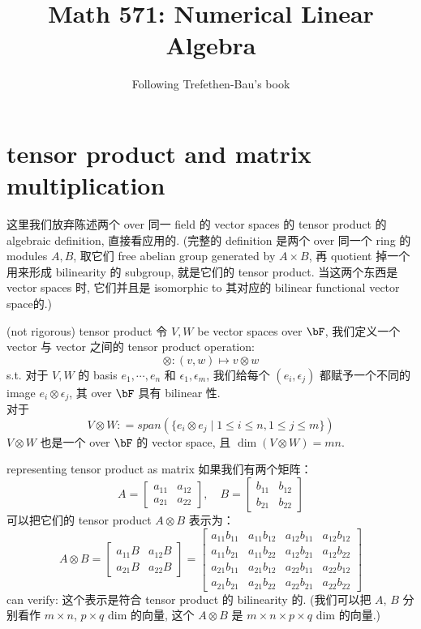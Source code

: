 \documentclass[lang=cn,11pt]{elegantbook}
\title{Math 571: Numerical Linear Algebra}
\subtitle{Following Trefethen-Bau's book}
\begin{document}
\frontmatter
\tableofcontents
\mainmatter





\chapter{tensor product and matrix multiplication}
这里我们放弃陈述两个 over 同一 field 的 vector spaces 的 tensor product 的 algebraic definition, 直接看应用的. (完整的 definition 是两个 over 同一个 ring 的 modules $A,B$, 取它们 free abelian group generated by $A\times B$, 再 quotient 掉一个用来形成 bilinearity 的 subgroup, 就是它们的 tensor product. 当这两个东西是 vector spaces 时, 它们并且是 isomorphic to 其对应的 bilinear functional vector space的.)
\begin{definition}{(not rigorous) tensor product}
令 $V,W$ be vector spaces over $\bF$, 我们定义一个 vector 与 vector 之间的 tensor product operation:
$$
\otimes :(v,w) \mapsto v \otimes w
$$
s.t. 对于 $V, W$ 的 basis $e_1, \cdots, e_n$ 和 $\epsilon_1, \epsilon_m$, 我们给每个 $(e_i, \epsilon_j)$ 都赋予一个不同的 image $e_i \otimes \epsilon_j$,  其 over $\bF$ 具有 bilinear 性.\\
对于 
$$
V \otimes W : = span(\{ e_i \otimes e_j \mid 1 \leq i \leq n, 1\leq j\leq m    \})
$$
$V \otimes W $ 也是一个 over $\bF$ 的 vector space, 且 $\dim(V \otimes W) = mn$.
\end{definition}

\begin{proposition}{representing tensor product as matrix}
 如果我们有两个矩阵：
\[
A = \begin{bmatrix} a_{11} & a_{12} \\ a_{21} & a_{22} \end{bmatrix}, \quad
B = \begin{bmatrix} b_{11} & b_{12} \\ b_{21} & b_{22} \end{bmatrix}
\]
可以把它们的 tensor product \( A \otimes B \) 表示为：
\[
A \otimes B =
\begin{bmatrix} 
a_{11} B & a_{12} B \\ 
a_{21} B & a_{22} B 
\end{bmatrix}
=
\begin{bmatrix} 
a_{11} b_{11} & a_{11} b_{12} & a_{12} b_{11} & a_{12} b_{12} \\ 
a_{11} b_{21} & a_{11} b_{22} & a_{12} b_{21} & a_{12} b_{22} \\ 
a_{21} b_{11} & a_{21} b_{12} & a_{22} b_{11} & a_{22} b_{12} \\ 
a_{21} b_{21} & a_{21} b_{22} & a_{22} b_{21} & a_{22} b_{22} 
\end{bmatrix}
\]
can verify: 这个表示是符合 tensor product 的 bilinearity 的.
(我们可以把 $A$, $B$ 分别看作 $m\times n$, $p \times q$ dim 的向量, 这个 $A \otimes B$ 是 $m\times n \times p\times q$ dim 的向量.)
\end{proposition}
\end{document}
